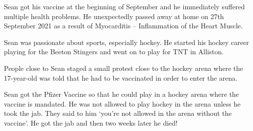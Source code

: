 Sean got his vaccine at the beginning of September and he immediately suffered
multiple health problems. He unexpectedly passed away at home on 27th September
2021 as a result of Myocarditis – Inflammation of the Heart Muscle.

Sean was passionate about sports, especially hockey. He started his hockey
career playing for the Beeton Stingers and went on to play for TNT in Alliston.

People close to Sean staged a small protest close to the hockey arena where the
17-year-old was told that he had to be vaccinated in order to enter the arena.

Sean got the Pfizer Vaccine so that he could play in a hockey arena where the
vaccine is mandated. He was not allowed to play hockey in the arena unless he
took the jab. They said to him ‘you’re not allowed in the arena without the
vaccine’. He got the jab and then two weeks later he died!
